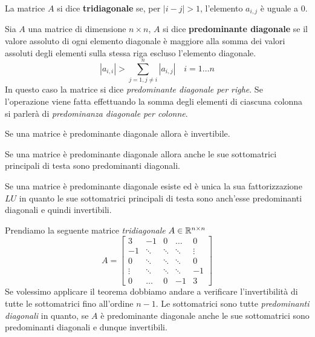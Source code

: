 \begin{definition}
	La matrice $A$ si dice \textbf{tridiagonale} se, per $|i - j| > 1$, l'elemento $a_{i,j}$ è uguale a 0.
\end{definition}

\begin{definition}
	Sia $A$ una matrice di dimensione $n \times n$, $A$ si dice \textbf{predominante diagonale} se il valore
	assoluto di ogni elemento diagonale è maggiore alla somma dei valori assoluti degli elementi sulla stessa
	riga escluso l'elemento diagonale.
	\[ |a_{i,i}| > \sum_{j=1, j \neq i}^{n} |a_{i,j}| \quad i = 1 \dots n \]
	In questo caso la matrice si dice \emph{predominante diagonale per righe}. Se
	l'operazione viene fatta effettuando la somma degli elementi di ciascuna colonna si parlerà di
	\emph{predominanza diagonale per colonne}.
\end{definition}

\begin{proposition}
	Se una matrice è predominante diagonale allora è invertibile.
\end{proposition}

\begin{proposition}
	Se una matrice è predominante diagonale allora anche le sue sottomatrici principali di testa sono predominanti
	diagonali.
\end{proposition}

\begin{proposition}
	Se una matrice è predominante diagonale esiste ed è unica la sua fattorizzazione $LU$ in quanto le sue
	sottomatrici principali di testa sono anch'esse predominanti diagonali e quindi invertibili.
\end{proposition}

\begin{example}
	Prendiamo la seguente matrice \emph{tridiagonale} $A \in \mathbb{R}^{n \times n}$
	\[
		A = \begin{bmatrix}
			3      & -1     & 0      & \dots  & 0      \\
			-1     & \ddots & \ddots & \ddots & \vdots \\
			0      & \ddots & \ddots & \ddots & 0      \\
			\vdots & \ddots & \ddots & \ddots & -1     \\
			0      & \dots  & 0      & -1     & 3
		\end{bmatrix}
	\]
	Se volessimo applicare il teorema dobbiamo andare a verificare l'invertibilità di tutte le sottomatrici fino
	all'ordine $n-1$. Le sottomatrici sono tutte \emph{predominanti diagonali} in quanto, se $A$ è predominante
	diagonale anche le sue sottomatrici sono predominanti diagonali e dunque invertibili.
\end{example}

